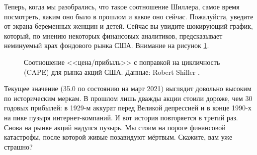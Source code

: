 Теперь, когда мы разобрались, что такое соотношение Шиллера, самое время посмотреть, каким оно было в прошлом и какое оно сейчас. Пожалуйста, уведите от экрана беременных женщин и детей. Сейчас вы увидите шокирующий график, который, по мнению некоторых  финансовых аналитиков, предсказывает неминуемый крах фондового рынка США. Внимание на рисунок \ref{shiller_pe_historical_chart}.



\newcommand{\dotWithNumber}[5] {
        \node[
            circle,
            fill,
            inner sep = 2pt,
            color = #3
        ]
        at (axis cs: #1, #2) {};
        
        \node[
            anchor=#5
        ]
        at (axis cs: #1, #2)
        {#4};
}



\begin{figure}[ht]
\centering
{}
\caption{Соотношение <<цена/прибыль>> с поправкой на цикличность (CAPE) для рынка акций США. Данные: Robert Shiller \cite{shillerOnline}.}
\label{shiller_pe_historical_chart}
\end{figure}

Текущее значение (35.0 по состоянию на март 2021) выглядит довольно высоким по историческим меркам. В прошлом лишь дважды акции стоили дороже, чем 30 годовых прибылей: в 1929-м аккурат перед Великой депрессией и в конце 1990-х на пике пузыря интернет-компаний. И вот история повторяется в третий раз. Снова на рынке акций надулся пузырь. Мы стоим на пороге финансовой катастрофы, после которой живые позавидуют мёртвым. Скажите, вам уже страшно?


